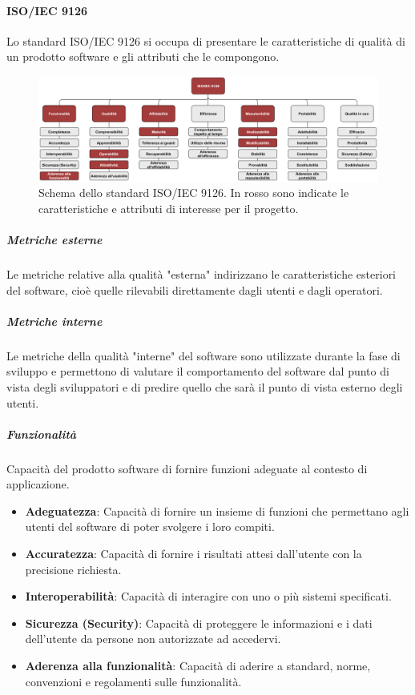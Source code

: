 \paragraph{ISO/IEC 9126}
Lo standard ISO/IEC 9126 si occupa di presentare le caratteristiche di qualità di un prodotto software e gli attributi che le compongono.

\begin{figure}[h]
    \centering
    \includegraphics[scale=0.53]{Immagini/IsoIec9126.png}
    \caption{Schema dello standard ISO/IEC 9126. In rosso sono indicate le caratteristiche e attributi di interesse per il progetto.}
\end{figure}

\subparagraph{Metriche esterne}
Le metriche relative alla qualità "esterna" indirizzano le caratteristiche esteriori del software, cioè quelle rilevabili direttamente dagli utenti e dagli operatori.

\subparagraph{Metriche interne}
 Le metriche della qualità "interne" del software sono utilizzate durante la fase di sviluppo e permettono di valutare il comportamento del software dal punto di vista degli sviluppatori e di predire quello che sarà il punto di vista esterno degli utenti.

\subparagraph{Funzionalità}
Capacità del prodotto software di fornire funzioni adeguate al contesto di applicazione.
\begin{itemize}
\item \textbf{Adeguatezza}: Capacità di fornire un insieme di funzioni che permettano agli utenti del software di poter svolgere i loro compiti.
\item \textbf{Accuratezza}: Capacità di fornire i risultati attesi dall’utente con la precisione richiesta.
\item \textbf{Interoperabilità}: Capacità di interagire con uno o più sistemi specificati.
\item \textbf{Sicurezza (Security)}: Capacità di proteggere le informazioni e i dati dell’utente da persone non autorizzate ad accedervi.
\item \textbf{Aderenza alla funzionalità}: Capacità di aderire a standard, norme, convenzioni e regolamenti sulle funzionalità.
\end{itemize}

